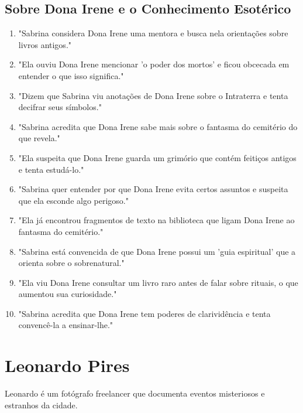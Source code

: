 \subsection*{Sobre Dona Irene e o Conhecimento Esotérico}
\begin{enumerate}
    \item "Sabrina considera Dona Irene uma mentora e busca nela orientações sobre livros antigos."
    \item "Ela ouviu Dona Irene mencionar 'o poder dos mortos' e ficou obcecada em entender o que isso significa."
    \item "Dizem que Sabrina viu anotações de Dona Irene sobre o Intraterra e tenta decifrar seus símbolos."
    \item "Sabrina acredita que Dona Irene sabe mais sobre o fantasma do cemitério do que revela."
    \item "Ela suspeita que Dona Irene guarda um grimório que contém feitiços antigos e tenta estudá-lo."
    \item "Sabrina quer entender por que Dona Irene evita certos assuntos e suspeita que ela esconde algo perigoso."
    \item "Ela já encontrou fragmentos de texto na biblioteca que ligam Dona Irene ao fantasma do cemitério."
    \item "Sabrina está convencida de que Dona Irene possui um 'guia espiritual' que a orienta sobre o sobrenatural."
    \item "Ela viu Dona Irene consultar um livro raro antes de falar sobre rituais, o que aumentou sua curiosidade."
    \item "Sabrina acredita que Dona Irene tem poderes de clarividência e tenta convencê-la a ensinar-lhe."
\end{enumerate}

\section{Leonardo Pires}
Leonardo é um fotógrafo freelancer que documenta eventos misteriosos e estranhos da cidade.

